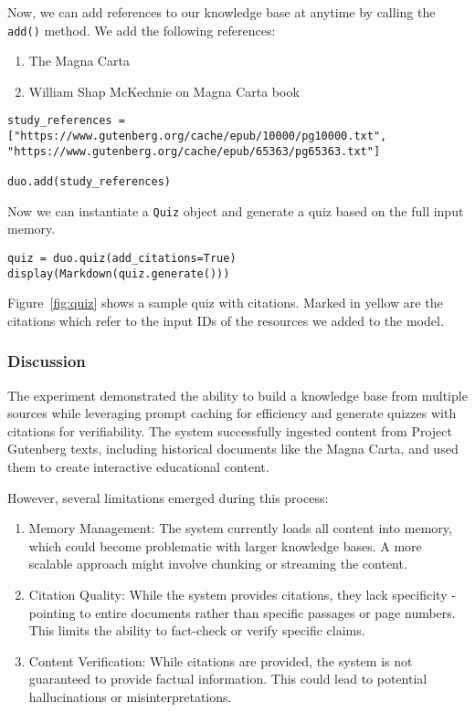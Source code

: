 Now, we can add references to our knowledge base at anytime by calling the \texttt{add()} method. We add the following references:
\begin{enumerate}
\item The Magna Carta
\item William Shap McKechnie on Magna Carta book
\end{enumerate}

\begin{verbatim}
study_references = ["https://www.gutenberg.org/cache/epub/10000/pg10000.txt", 
"https://www.gutenberg.org/cache/epub/65363/pg65363.txt"]

duo.add(study_references)
\end{verbatim}

Now we can instantiate a \texttt{Quiz} object and generate a quiz based on the full input memory.

\begin{verbatim}
quiz = duo.quiz(add_citations=True)
display(Markdown(quiz.generate()))
\end{verbatim}

Figure~\ref{fig:quiz} shows a sample quiz with citations. Marked in yellow are the citations which refer to the input IDs of the resources we added to the model.



\subsubsection{Discussion}

The experiment demonstrated the ability to build a knowledge base from multiple sources while leveraging prompt caching for efficiency and generate quizzes with citations for verifiability. The system successfully ingested content from Project Gutenberg texts, including historical documents like the Magna Carta, and used them to create interactive educational content.

However, several limitations emerged during this process:

\begin{enumerate}
\item Memory Management: The system currently loads all content into memory, which could become problematic with larger knowledge bases. A more scalable approach might involve chunking or streaming the content.

\item Citation Quality: While the system provides citations, they lack specificity - pointing to entire documents rather than specific passages or page numbers. This limits the ability to fact-check or verify specific claims.

\item Content Verification: While citations are provided, the system is not guaranteed to provide factual information. This could lead to potential hallucinations or misinterpretations.
\end{enumerate}

